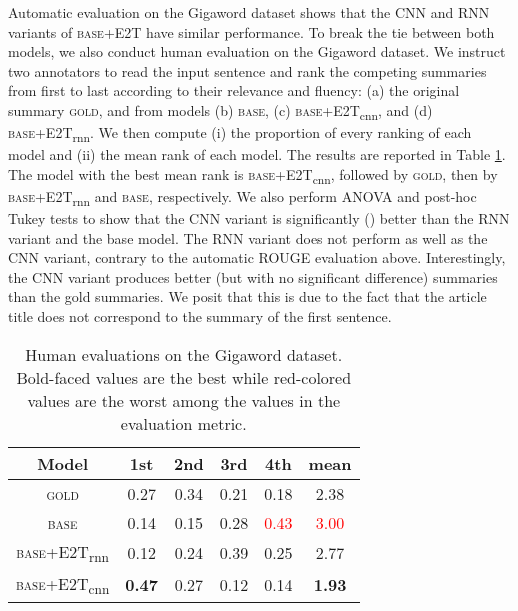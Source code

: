 \documentclass[11pt,a4paper]{article}
\begin{document}
Automatic evaluation on the Gigaword dataset shows that the CNN and RNN variants of \textsc{base}+E2T have similar performance.
To break the tie between both models, we also conduct human evaluation on the Gigaword dataset. We instruct two annotators to read the input sentence and rank the competing summaries from first to last according to their relevance and fluency: 
(a) the original summary \textsc{gold}, and
from models (b) \textsc{base}, (c) \textsc{base}+E2T\textsubscript{cnn}, and (d) \textsc{base}+E2T\textsubscript{rnn}. We then compute (i) the proportion of every ranking of each model and (ii) the mean rank of each model. The results are reported in Table \ref{tab:human}.
The model with the best mean rank is \textsc{base}+E2T\textsubscript{cnn}, followed by \textsc{gold}, then by \textsc{base}+E2T\textsubscript{rnn} and \textsc{base}, respectively.
We also perform ANOVA and post-hoc Tukey tests to show that the CNN variant is significantly () better than the RNN variant and the base model.
The RNN variant does not perform as well as the CNN variant, contrary to the automatic ROUGE evaluation above.
Interestingly, the CNN variant produces better (but with no significant difference) summaries than the gold summaries. We posit that this is due to the fact that the article title does not correspond to the summary of the first sentence.

\begin{table}
    \small
    \centering
    \begin{tabular}{|c|cccc|c|}
        \hline
        Model & 1st & 2nd & 3rd & 4th & mean \\ \hline
        \textsc{gold} & 0.27 & 0.34 & 0.21 & 0.18 & 2.38 \\ 
        \textsc{base} & 0.14 & 0.15 & 0.28 & \textcolor{red}{0.43} & \textcolor{red}{3.00} \\ 
        \textsc{base}+E2T\textsubscript{rnn} & {0.12} & 0.24 & 0.39 & 0.25 & 2.77 \\ 
        \textsc{base}+E2T\textsubscript{cnn} & \textbf{0.47} & 0.27 & 0.12 & 0.14 & \textbf{1.93} \\ \hline
    \end{tabular}
    \caption{Human evaluations on the Gigaword dataset. Bold-faced values are the best while red-colored values are the worst among the values in the evaluation metric.}
    \label{tab:human}
\end{table}
\end{document}
